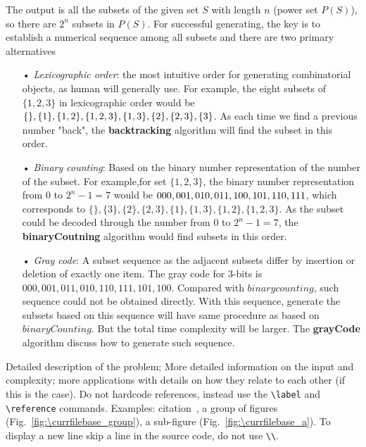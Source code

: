 \documentclass[catalog.tex]{subfiles}
\begin{document}
The output  is all the subsets of the given set $S$ with length $n$ (power set $P(S)$), so there are $2^n$ subsets in $P(S)$. For successful generating, the key is to establish a numerical sequence among all subsets and there are two primary alternatives \cite{1}
\begin{enumerate}
\item[•] \textit{Lexicographic order}: the most intuitive order for generating combinatorial objects, as human will generally use. For example, the eight subsets of $\{ 1, 2, 3\}$ in lexicographic order would be $\{ \}, \{1\}, \{1,2\}, \{1,2,3\}, \\ \{1,3\}, \{2\}, \{2,3\}, \{3\}$. As each time we find a previous number "back", the \textbf{backtracking} algorithm will find the subset in this order. 

\item[•] \textit{Binary counting}: Based on the binary number representation of the number of the subset. For example,for set $\{ 1, 2, 3\}$, the binary number representation from $0$ to $2^n-1 = 7$ would be $000, 001, 010, 011, 100, 101, 110,\\ 111$, which corresponds to $\{ \}, \{3\}, \{2\}, \{2,3\},  \{1\}, \{1,3\}, \{1,2\}, \{1,2,3\}$. As the subset could be decoded through the number from $0$ to $2^n-1 = 7$, the \textbf{binaryCoutning} algorithm would find subsets in this order. 

\item[•] \textit{Gray code}: A subset sequence as the adjacent subsets differ by insertion or deletion of exactly one item. The gray code for 3-bits is  $000, 001, 011, 010, 110, 111, 101, 100$. Compared with $binary counting$, such sequence could not be obtained directly. With this sequence, generate the subsets based on this sequence will have same procedure as based on $binaryCounting$. But the total time complexity will be larger. The \textbf{grayCode} algorithm discuss how to generate such sequence.  
\end{enumerate}




Detailed description of the problem; More detailed information on the input and complexity; more applications with details on how they relate to each other (if this is the case). Do not hardcode references,  instead use the {\tt \textbackslash label} and {\tt \textbackslash reference} commands.  Examples: citation~\cite{ve477}, a group of figures (Fig.~\ref{fig:\currfilebase_group}), a sub-figure (Fig.~\ref{fig:\currfilebase_a}). To display a new line skip a line in the source code, do not use {\tt \textbackslash\textbackslash}.
\end{document}
